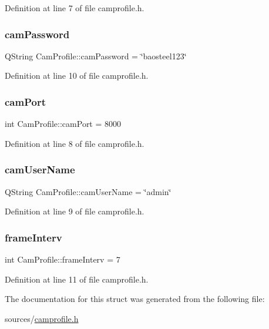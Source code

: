 Definition at line 7 of file camprofile.\+h.

\mbox{\label{struct_cam_profile_a858a51162bbd2a1b3cee2efddf16c65f}} 
\subsubsection{\texorpdfstring{cam\+Password}{camPassword}}
{\footnotesize\ttfamily Q\+String Cam\+Profile\+::cam\+Password = \char`\"{}baosteel123\char`\"{}}



Definition at line 10 of file camprofile.\+h.

\mbox{\label{struct_cam_profile_aa0b5ff29518521fa54e3d10b13176cea}} 
\subsubsection{\texorpdfstring{cam\+Port}{camPort}}
{\footnotesize\ttfamily int Cam\+Profile\+::cam\+Port = 8000}



Definition at line 8 of file camprofile.\+h.

\mbox{\label{struct_cam_profile_a0ea16ae25e305f80425bd43aaebd5e03}} 
\subsubsection{\texorpdfstring{cam\+User\+Name}{camUserName}}
{\footnotesize\ttfamily Q\+String Cam\+Profile\+::cam\+User\+Name = \char`\"{}admin\char`\"{}}



Definition at line 9 of file camprofile.\+h.

\mbox{\label{struct_cam_profile_a305832f4d32f5a7c42fa44a07e9e2565}} 
\subsubsection{\texorpdfstring{frame\+Interv}{frameInterv}}
{\footnotesize\ttfamily int Cam\+Profile\+::frame\+Interv = 7}



Definition at line 11 of file camprofile.\+h.



The documentation for this struct was generated from the following file\+:\begin{DoxyCompactItemize}
\item 
sources/\mbox{\hyperlink{camprofile_8h}{camprofile.\+h}}\end{DoxyCompactItemize}
